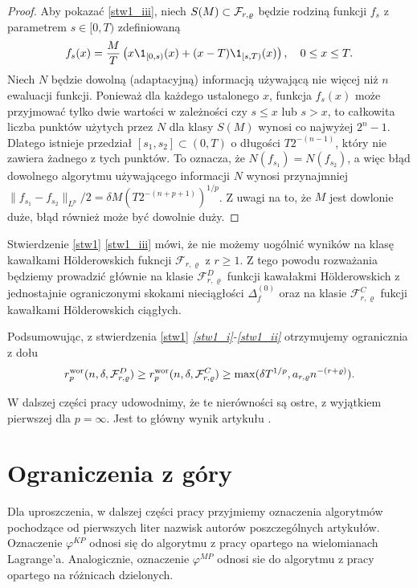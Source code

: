 \documentclass[oik, pdftex, man]{mgrwms}
\begin{document}
\begin{proof}
        Aby pokazać \ref{stw1_iii}, niech $S(M) \subset \mathcal{F}_{r, \varrho}$ będzie rodziną funkcji $f_{s}$ z parametrem $s \in [0, T)$ zdefiniowaną
        \begin{equation*}
            f_{s}(x) = \frac{M}{T}\left( x\1_{[0,s)}(x) + (x-T)\1_{[s,T)}(x) \right), \quad 0 \leq x \leq T.
        \end{equation*}
        Niech $N$ będzie dowolną (adaptacyjną) informacją używającą nie więcej niż $n$ ewaluacji funkcji. Ponieważ dla każdego ustalonego $x$, funkcja $f_{s}(x)$ może przyjmować tylko dwie wartości w zależności czy $s \leq x$ lub $s > x$, to całkowita liczba punktów użytych przez $N$ dla klasy $S(M)$ wynosi co najwyżej $2^{n}-1$. Dlatego istnieje przedział $[s_{1}, s_{2}] \subset (0,T)$ o długości $T 2^{-(n-1)}$, który nie zawiera żadnego z tych punktów. To oznacza, że  $N(f_{s_{1}}) = N(f_{s_{2}})$, a więc błąd dowolnego algorytmu używającego informacji $N$ wynosi przynajmniej $\| f_{s_{1}} - f_{s_{2}} \|_{L^{p}} / 2 = \delta M(T 2^{-(n+p+1)})^{1/p}$. Z uwagi na to, że $M$ jest dowlonie duże, błąd również może być dowolnie duży.
    \end{proof}

    Stwierdzenie \ref{stw1} \ref{stw1_iii} mówi, że nie możemy uogólnić wyników na klasę kawałkami Hölderowskich fukncji $\mathcal{F}_{r,\varrho}$ z $r \geq 1$. Z tego powodu rozważania będziemy prowadzić głównie na klasie $\mathcal{F}_{r,\varrho}^{D}$ funkcji kawałakmi Hölderowskich z jednostajnie ograniczonymi skokami nieciągłości $\Delta_{f}^{(0)}$ oraz na klasie $\mathcal{F}_{r,\varrho}^{C}$ fukcji kawałkami Hölderowskich ciągłych.

    Podsumowując, z stwierdzenia \ref{stw1} \textit{\ref{stw1_i}-\ref{stw1_ii}} otrzymujemy ogranicznia z dołu
    \begin{equation*}
        r^{\mathrm{wor}}_{p}(n, \delta, \mathcal{F}^{D}_{r,\varrho}) \geq r^{\mathrm{wor}}_{p}(n, \delta, \mathcal{F}^{C}_{r,\varrho}) \geq \max(\delta T^{1/p}, a_{r,\varrho} n^{-(r+\varrho)}).
    \end{equation*}

    W dalszej części pracy udowodnimy, że te nierówności są ostre, z wyjątkiem pierwszej dla $p=\infty$. Jest to główny wynik artykułu \cite{AoP}.


\section{Ograniczenia z góry}


    Dla uproszczenia, w dalszej części pracy przyjmiemy oznaczenia algorytmów pochodzące od pierwszych liter nazwisk autorów poszczególnych artykułów. Oznaczenie $\varphi^{KP}$ odnosi się do algorytmu z pracy \cite{CoDF} opartego na wielomianach Lagrange'a. Analogicznie, oznaczenie $\varphi^{MP}$ odnosi sie do algorytmu z pracy \cite{AoP} opartego na różnicach dzielonych.
\end{document}
